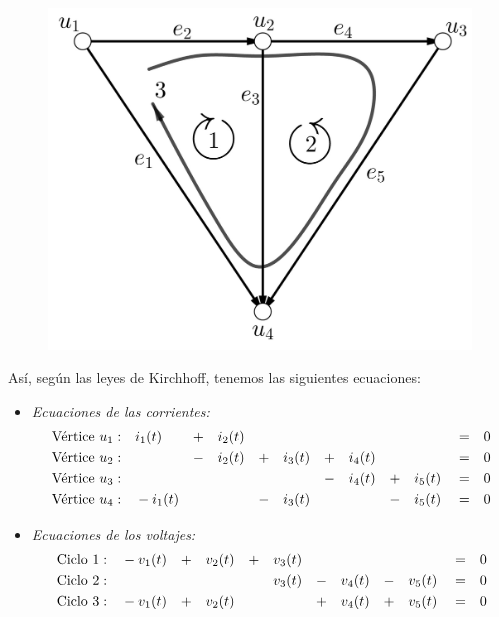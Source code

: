 \begin{figure}[H]
    \centering
    \includegraphics[scale=0.2]{img/imgchapter4/redelectricagraficaasociada.jpg}
    \caption{}
    \label{fig:redelectricagraficaasociada}
\end{figure}

Así, según las leyes de Kirchhoff, tenemos las siguientes ecuaciones:

\begin{itemize}
    \item \textit{Ecuaciones de las corrientes:}
    \begin{align*}
    \textnormal{Vértice }u_{1} &:&  &i_{1}(t)&  &+& &i_{2}(t)& & &   & &      & & & &        && && &=&0  \\  
    \textnormal{Vértice }u_{2} &:&    &&        &-& &i_{2}(t)& &+& &i_{3}(t)& &+& &i_{4}(t)& && && &=& 0 \\
    \textnormal{Vértice }u_{3} &:&    &&        & & & & & & & &               &-& &i_{4}(t)& &+& &i_{5}(t)& &=& 0 \\
    \textnormal{Vértice }u_{4} &:&  &-i_{1}(t)& & & & & &-& &i_{3}(t)& & & & & &-& &i_{5}(t)& &=& 0
    \end{align*}
    
    \item \textit{Ecuaciones de los voltajes:}
        \begin{align*}
   \textnormal{Ciclo }1 &:&  &-v_{1}(t)&  &+& &v_{2}(t)& &+&   &v_{3}(t) &      & & & &        && && &=&0  \\  
   \textnormal{Ciclo }2 &:&    &&        & & & & & & &v_{3}(t)& &-& &v_{4}(t)& &-& &v_{5}(t)& &=& 0 \\
   \textnormal{Ciclo }3 &:&  &-v_{1}(t)&   &+& &v_{2}(t)& & &  & & &+& &v_{4}(t)& &+& &v_{5}(t)& &=& 0 \\
    \end{align*}
\end{itemize}

